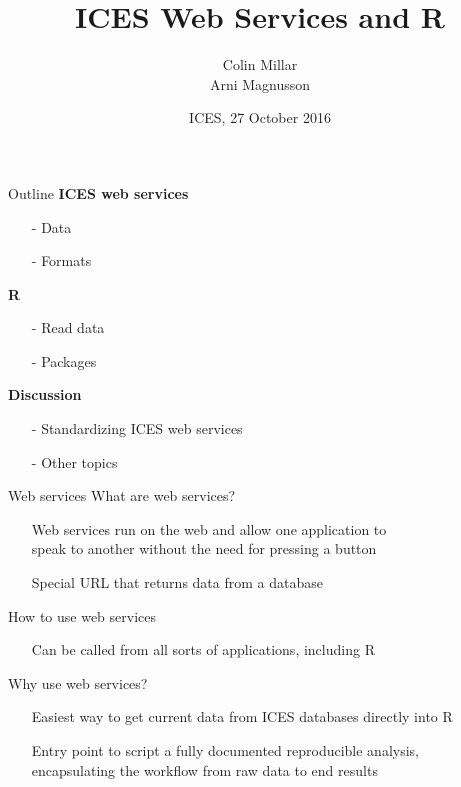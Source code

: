 \documentclass[aspectratio=169]{beamer}
\title{ICES Web Services and R}
\author{Colin Millar\\[0.5ex]Arni Magnusson}
\date{ICES, 27 October 2016}
\begin{document}
\begin{frame}
  \titlepage
\end{frame}

\begin{frame}{Outline}\small
  \textbf{ICES web services}\\[-1ex]
  \begin{itemize}
    \item[-] Data
    \item[-] Formats\\[4ex]
  \end{itemize}
  \textbf{R}\\[-1.5ex]
  \begin{itemize}
    \item[-] Read data
    \item[-] Packages\\[4.5ex]
  \end{itemize}
  \textbf{Discussion}\\[-1ex]
  \begin{itemize}
    \item[-] Standardizing ICES web services
    \item[-] Other topics\\[3ex]
  \end{itemize}
\end{frame}


\begin{frame}{Web services}\small
  {\green What are web services?}\\[-1ex]
  \begin{itemize}\footnotesize
    \item[] Web services run on the web and allow one application to\\
    speak to another without the need for pressing a button\\[1.5ex]
    \item[] Special URL that returns data from a database\\[4.5ex]
  \end{itemize}
  {\green How to use web services}\\[-1ex]
  \begin{itemize}\normalfont\footnotesize
    \item[] Can be called from all sorts of applications, including R\\[4.5ex]
  \end{itemize}
  {\green Why use web services?}\\[-1ex]
  \begin{itemize}\normalfont\footnotesize
    \item[] Easiest way to get current data from ICES databases directly into
    R\\[1.5ex]
    \item[] Entry point to script a fully documented reproducible analysis,\\
    encapsulating the workflow from raw data to end results\\[4.5ex]
  \end{itemize}
\end{frame}
\end{document}
